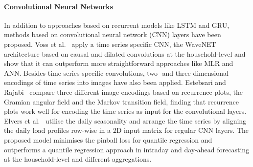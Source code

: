 \paragraph{Convolutional Neural Networks} In addition to approaches based on recurrent models like LSTM and GRU, methods based on convolutional neural network (CNN) layers have been proposed. Voss et al.~\cite{voss2018residential} apply a time series specific CNN, the WaveNET architecture based on causal and dilated convolutions at the household-level and show that it can outperform more straightforward approaches like MLR and ANN. Besides time series specific convolutions, two- and three-dimensional encodings of time series into images have also been applied. Estebsari and Rajabi~\cite{estebsari2020srl} compare three different image encodings based on recurrence plots, the Gramian angular field and the Markov transition field, finding that recurrence plots work well for encoding the time series as input for the convolutional layers. Elvers et al.~\cite{Elvers2019spl} utilise the daily seasonality and arrange the time series by aligning the daily load profiles row-wise in a 2D input matrix for regular CNN layers. The proposed model minimises the pinball loss for quantile regression and outperforms a quantile regression approach in intraday and day-ahead forecasting at the household-level and different aggregations.


